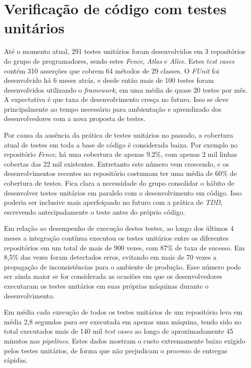 \hypertarget{fence-unit-test-resultados}{%
\section{Verificação de código com testes unitários}\label{fence-unit-test-resultados}}

Até o momento atual, 291 testes unitários foram desenvolvidos em 3 repositórios do grupo de programadores, sendo estes \emph{Fence}, \emph{Atlas} e \emph{Alice}. Estes \emph{test cases} contém 310 asserções que cobrem 64 métodos de 29 classes. O \emph{FUnit} foi desenvolvido há 6 meses atrás, e desde então mais de 100 testes foram desenvolvidos utilizando o \emph{framework}, em uma média de quase 20 testes por mês. A expectativa é que taxa de desenvolvimento cresça no futuro. Isso se deve principalmente ao tempo necessário para ambientação e aprendizado dos desenvolvedores com a nova proposta de testes.

Por causa da ausência da prática de testes unitários no passado, a cobertura atual de testes em toda a base de código é considerada baixa. Por exemplo no repositório \emph{Fence}, há uma cobertura de apenas 9.2\%, com apenas 2 mil linhas cobertas das 22 mil existentes. Entretanto este número vem crescendo, e os desenvolvimentos recentes no repositório costumam ter uma média de 60\% de cobertura de testes. Fica clara a necessidade do grupo consolidar o hábito de desenvolver testes unitários em paralelo com o desenvolvimento em código. Isso poderia ser inclusive mais aperfeiçoado no futuro com a prática de \emph{TDD}, escrevendo antecipadamente o teste antes do próprio código.

Em relação ao desempenho de execução destes testes, ao longo dos últimos 4 meses a integração contínua executou os testes unitários entre os diferentes repositórios em um total de mais de 900 vezes, com 87\% de taxa de sucesso. Em 8,5\% das vezes foram detectados erros, evitando em mais de 70 vezes a propagação de inconsistências para o ambiente de produção. Esse número pode ser ainda maior se for considerada as ocasiões em que os desenvolvedores executaram os testes unitários em suas próprias máquinas durante o desenvolvimento.

Em média cada execução de todos os testes unitários de um repositório leva em média 2,8 segundos para ser executada em apenas uma máquina, tendo sido no total executados mais de 140 mil \emph{test cases} ao longo de aproximadamente 45 minutos nas \emph{pipelines}. Estes dados mostram o custo extremamente baixo exigido pelos testes unitários, de forma que não prejudicam o processo de entregas rápidas.

